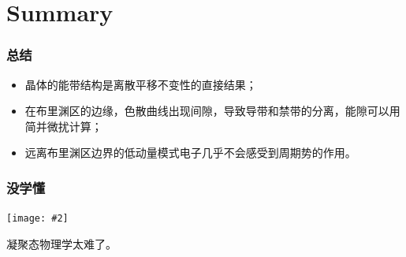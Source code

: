 \documentclass[CJK]{beamer}
\newcommand{\cpic}[2]{
\begin{center}
\texttt{[image: \#2]}
\end{center}
}
\begin{document}
\section{Summary}
\begin{frame}
\frametitle{\bch 总结 \ech}
\bch
\begin{itemize}
\item 晶体的能带结构是离散平移不变性的直接结果；
\item 在布里渊区的边缘，色散曲线出现间隙，导致导带和禁带的分离，能隙可以用简并微扰计算；
\item 远离布里渊区边界的低动量模式电子几乎不会感受到周期势的作用。
\end{itemize}
\ech
\end{frame}

\begin{frame}
\frametitle{\bch 没学懂 \ech}
\bch
\cpic{0.3}{not_understand}
凝聚态物理学太难了。
\ech
\end{frame}
\end{document}
